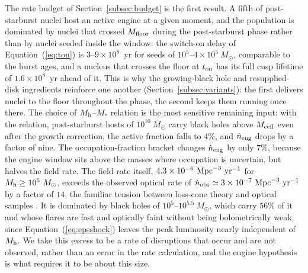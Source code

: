 \documentclass[twocolumn,pdftex]{aastex701}
\newcommand{\msun}{M_{\odot}\xspace}
\begin{document}
The rate budget of Section~\ref{subsec:budget} is the first result. A fifth of post-starburst nuclei host an active engine at a given moment, and the population is dominated by nuclei that crossed $M_{\rm floor}$ during the post-starburst phase rather than by nuclei seeded inside the window: the switch-on delay of Equation~(\ref{eq:ton}) is $3$--$9 \times 10^{8}$~yr for seeds of $10^{5}$--$4 \times 10^{5}~\msun$, comparable to the burst ages, and a nucleus that crosses the floor at $t_{\rm on}$ has its full cusp lifetime of $1.6 \times 10^{8}$~yr ahead of it. This is why the growing-black hole and resupplied-disk ingredients reinforce one another (Section~\ref{subsec:variants}): the first delivers nuclei to the floor throughout the phase, the second keeps them running once there. The choice of $M_{\rm h}$--$M_\ast$ relation is the most sensitive remaining input: with the \citet{Kormendy:2013a} relation, post-starburst hosts of $10^{10}~\msun$ carry black holes above $M_{\rm ceil}$ even after the growth correction, the active fraction falls to $4\%$, and $\dot{n}_{\rm eng}$ drops by a factor of nine. The occupation-fraction bracket changes $\dot{n}_{\rm eng}$ by only $7\%$, because the engine window sits above the masses where occupation is uncertain, but halves the field rate. The field rate itself, $4.3 \times 10^{-6}~{\rm Mpc}^{-3}~{\rm yr}^{-1}$ for $M_{\rm h} \geq 10^{5}~\msun$, exceeds the observed optical rate of $\dot{n}_{\rm obs} \simeq 3 \times 10^{-7}~{\rm Mpc}^{-3}~{\rm yr}^{-1}$ by a factor of $14$, the familiar tension between loss-cone theory and optical samples \citep{Stone:2016a,vanVelzen:2018a,Yao:2023a}. It is dominated by black holes of $10^{5}$--$10^{5.5}~\msun$, which carry $56\%$ of it and whose flares are fast and optically faint without being bolometrically weak, since Equation~(\ref{eq:epsshock}) leaves the peak luminosity nearly independent of $M_{\rm h}$. We take this excess to be a rate of disruptions that occur and are not observed, rather than an error in the rate calculation, and the engine hypothesis is what requires it to be about this size.
\end{document}
